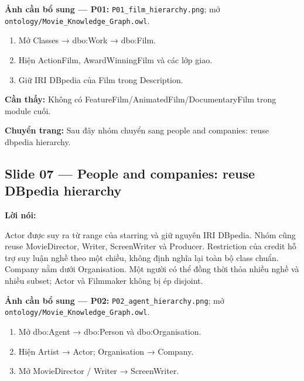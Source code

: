 \documentclass[
  11pt,
]{article}
\providecommand{\tightlist}{%
  \setlength{\itemsep}{0pt}\setlength{\parskip}{0pt}}
\begin{document}
\textbf{Ảnh cần bổ sung --- P01:}
\texttt{P01\_\allowbreak{}film\allowbreak{}\_\allowbreak{}hierarc\allowbreak{}hy.\allowbreak{}png};
mở
\texttt{ontology\allowbreak{}/\allowbreak{}\allowbreak{}Movie\_\allowbreak{}\allowbreak{}K\allowbreak{}nowledge\allowbreak{}\_\allowbreak{}\allowbreak{}Graph.\allowbreak{}o\allowbreak{}wl}.

\begin{enumerate}
\def\labelenumi{\arabic{enumi}.}
\tightlist
\item
  Mở Classes → dbo:Work → dbo:Film.
\item
  Hiện ActionFilm,
  Award\allowbreak{}Win\allowbreak{}ning\allowbreak{}Film\allowbreak{}
  và các lớp giao.
\item
  Giữ IRI DBpedia của Film trong Description.
\end{enumerate}

\textbf{Cần thấy:} Không có
Feature\allowbreak{}F\allowbreak{}ilm/\allowbreak{}\allowbreak{}Anim\allowbreak{}ated\allowbreak{}Film\allowbreak{}/\allowbreak{}\allowbreak{}Documen\allowbreak{}tary\allowbreak{}Film\allowbreak{}
trong module cuối.

\textbf{Chuyển trang:} Sau đây nhóm chuyển sang people and companies:
reuse dbpedia hierarchy.

\subsection{Slide 07 --- People and companies: reuse DBpedia
hierarchy}\label{slide-07-people-and-companies-reuse-dbpedia-hierarchy}

\textbf{Lời nói:}

Actor được suy ra từ range của starring và giữ nguyên IRI DBpedia. Nhóm
cũng reuse Movie\allowbreak{}Dir\allowbreak{}ector, Writer, ScreenWriter
và Producer. Restriction của credit hỗ trợ suy luận nghề theo một chiều,
không định nghĩa lại toàn bộ class chuẩn. Company nằm dưới
Organisa\allowbreak{}tion.\allowbreak{} Một người có thể đồng thời thỏa
nhiều nghề và nhiều subset; Actor và Filmmaker không bị ép disjoint.

\textbf{Ảnh cần bổ sung --- P02:}
\texttt{P02\_\allowbreak{}agen\allowbreak{}t\_\allowbreak{}hierar\allowbreak{}chy.\allowbreak{}png};
mở
\texttt{ontology\allowbreak{}/\allowbreak{}\allowbreak{}Movie\_\allowbreak{}\allowbreak{}K\allowbreak{}nowledge\allowbreak{}\_\allowbreak{}\allowbreak{}Graph.\allowbreak{}o\allowbreak{}wl}.

\begin{enumerate}
\def\labelenumi{\arabic{enumi}.}
\tightlist
\item
  Mở dbo:Agent → dbo:Person và
  dbo:\allowbreak{}\allowbreak{}Orga\allowbreak{}nisation\allowbreak{}.\allowbreak{}
\item
  Hiện Artist → Actor; Organisation → Company.
\item
  Mở Movie\allowbreak{}Dir\allowbreak{}ector / Writer →
  Screen\allowbreak{}Wr\allowbreak{}iter.\allowbreak{}
\end{enumerate}
\end{document}

